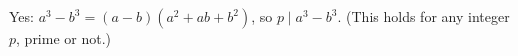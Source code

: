 Yes: $a^3-b^3=(a-b)\left(a^2+ab+b^2\right)$, so $p\mid a^3-b^3$. (This holds for any integer $p$, prime or not.)
